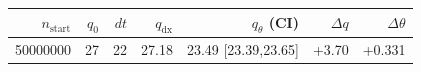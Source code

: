 \begin{tabular}{r r r r r r r}
\hline
$n_{\mathrm{start}}$ & $q_0$ & $dt$ & $q_{\mathrm{dx}}$ & $q_{\theta}$ (CI) & $\Delta q$ & $\Delta\theta$ \\
\hline
50000000 & 27 & 22 & 27.18 & 23.49 [23.39,23.65] & +3.70 & +0.331 \\
\hline
\end{tabular}
